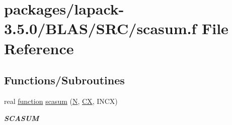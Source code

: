 \hypertarget{lapack-3_85_80_2BLAS_2SRC_2scasum_8f}{}\section{packages/lapack-\/3.5.0/\+B\+L\+A\+S/\+S\+R\+C/scasum.f File Reference}
\label{lapack-3_85_80_2BLAS_2SRC_2scasum_8f}
\subsection*{Functions/\+Subroutines}
\begin{DoxyCompactItemize}
\item 
real \hyperlink{afunc_8m_a7b5e596df91eadea6c537c0825e894a7}{function} \hyperlink{group__single__blas__level1_gadd7d12f994e4868ca9998b054707d934}{scasum} (\hyperlink{polmisc_8c_a0240ac851181b84ac374872dc5434ee4}{N}, \hyperlink{scsum1_8c_a5a76da95c549c41790389a76e12fdcb5}{C\+X}, I\+N\+C\+X)
\begin{DoxyCompactList}\small\item\em {\bfseries S\+C\+A\+S\+U\+M} \end{DoxyCompactList}\end{DoxyCompactItemize}
